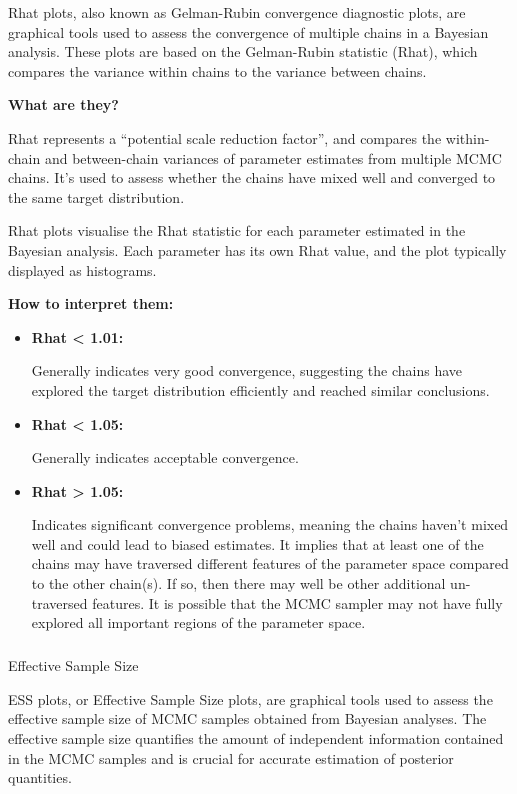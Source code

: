 \documentclass[
  8pt,
  a4paper]{article}
\makeatletter
\let\oldsubparagraph\subparagraph
\renewcommand{\subparagraph}{
    \@ifstar
      \xxxSubParagraphStar
      \xxxSubParagraphNoStar
  }
\newcommand{\xxxSubParagraphStar}[1]{\oldsubparagraph*{#1}\mbox{}}
\newcommand{\xxxSubParagraphNoStar}[1]{\oldsubparagraph{#1}\mbox{}}
\makeatother
\begin{document}
Rhat plots, also known as Gelman-Rubin convergence diagnostic plots, are
graphical tools used to assess the convergence of multiple chains in a
Bayesian analysis. These plots are based on the Gelman-Rubin statistic
(Rhat), which compares the variance within chains to the variance
between chains.

\textbf{What are they?}

Rhat represents a ``potential scale reduction factor'', and compares the
within-chain and between-chain variances of parameter estimates from
multiple MCMC chains. It's used to assess whether the chains have mixed
well and converged to the same target distribution.

Rhat plots visualise the Rhat statistic for each parameter estimated in
the Bayesian analysis. Each parameter has its own Rhat value, and the
plot typically displayed as histograms.

\textbf{How to interpret them:}

\begin{itemize}
\item
  \textbf{Rhat \textless{} 1.01:}

  Generally indicates very good convergence, suggesting the chains have
  explored the target distribution efficiently and reached similar
  conclusions.
\item
  \textbf{Rhat \textless{} 1.05:}

  Generally indicates acceptable convergence.
\item
  \textbf{Rhat \textgreater{} 1.05:}

  Indicates significant convergence problems, meaning the chains haven't
  mixed well and could lead to biased estimates. It implies that at
  least one of the chains may have traversed different features of the
  parameter space compared to the other chain(s). If so, then there may
  well be other additional un-traversed features. It is possible that
  the MCMC sampler may not have fully explored all important regions of
  the parameter space.
\end{itemize}

\subparagraph{Effective Sample Size}\label{effective-sample-size}

ESS plots, or Effective Sample Size plots, are graphical tools used to
assess the effective sample size of MCMC samples obtained from Bayesian
analyses. The effective sample size quantifies the amount of independent
information contained in the MCMC samples and is crucial for accurate
estimation of posterior quantities.
\end{document}
